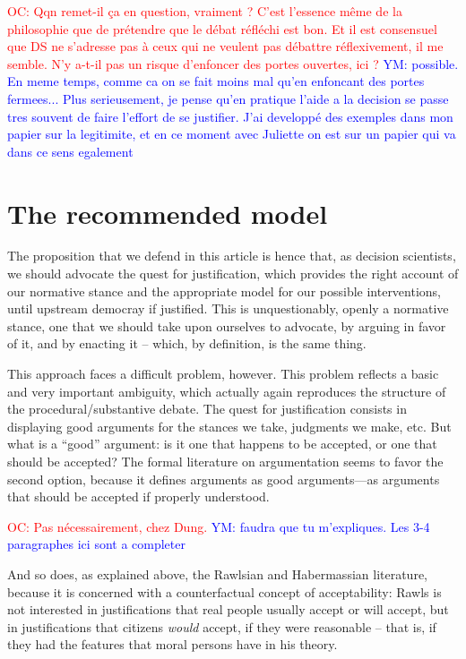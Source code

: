 \documentclass[preprint,11pt]{elsarticle}
\newcommand{\commentYM}[1]{\textcolor{blue}{YM: #1}}
\newcommand{\commentOC}[1]{\textcolor{red}{OC: #1}}
\begin{document}
\commentOC{Qqn remet-il ça en question,
vraiment ? C’est l’essence même de la philosophie que de
prétendre que le débat réfléchi est bon. Et il est consensuel
que DS ne s’adresse pas à ceux qui ne veulent pas débattre
réflexivement, il me semble. N’y a-t-il pas un risque
d’enfoncer des portes ouvertes, ici ?}
\commentYM{possible. En meme temps, comme ca on se fait moins mal qu'en enfoncant des portes fermees... Plus serieusement, je pense qu'en pratique l'aide a la decision se passe tres souvent de faire l'effort de se justifier. J'ai developpé des exemples dans mon papier sur la legitimite, et en ce moment avec Juliette on est sur un papier qui va dans ce sens egalement}


\section{The recommended model}
\noindent The proposition that we defend in this article is hence that, as decision scientists, we should advocate the quest for justification, which provides the right account of our normative stance and the appropriate model for our possible interventions, until upstream democray if justified. This is unquestionably, openly a normative stance, one that we should take upon ourselves to advocate, by arguing in favor of it, and by enacting it -- which, by definition, is the same thing.

This approach faces a difficult problem, however. This problem reflects a basic and very important ambiguity, which actually again reproduces the structure of the procedural/substantive debate. The quest for justification consists in displaying good arguments for the stances we take, judgments we make, etc. But what is a ``good'' argument: is it one that happens to be accepted, or one that should be accepted?
The formal literature on argumentation \cite{dung_acceptability_1995,besnard_elements_2008} seems to favor the second option, because it defines arguments as good arguments—as arguments that should be accepted if properly understood. 

\commentOC{Pas nécessairement, chez Dung.}
\commentYM{faudra que tu m'expliques. Les 3-4 paragraphes ici sont a completer}

And so does, as explained above, the Rawlsian and Habermassian literature, because it is concerned with a counterfactual concept of acceptability: Rawls is not interested in justifications that real people usually accept or will accept, but in justifications that citizens \emph{would} accept, if they were reasonable -- that is, if they had the features that moral persons have in his theory. %
\end{document}
